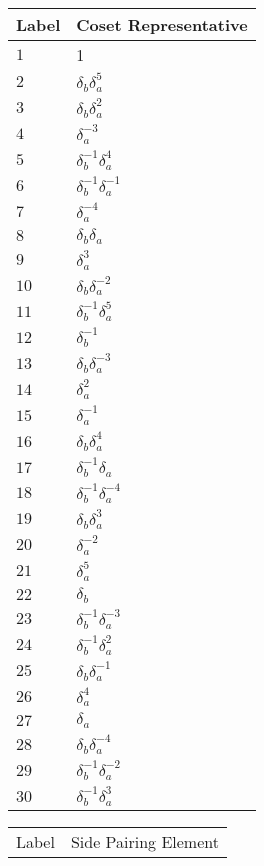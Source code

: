 \documentclass{article}
\begin{document}

\begin{center}
\begin{tabular}{ll}
\toprule
Label & Coset Representative\\
\midrule
$1$ & 1 \\
$2$ & $\delta_b^{}\delta_a^{5}$ \\
$3$ & $\delta_b^{}\delta_a^{2}$ \\
$4$ & $\delta_a^{-3}$ \\
$5$ & $\delta_b^{-1}\delta_a^{4}$ \\
$6$ & $\delta_b^{-1}\delta_a^{-1}$ \\
$7$ & $\delta_a^{-4}$ \\
$8$ & $\delta_b^{}\delta_a^{}$ \\
$9$ & $\delta_a^{3}$ \\
$10$ & $\delta_b^{}\delta_a^{-2}$ \\
$11$ & $\delta_b^{-1}\delta_a^{5}$ \\
$12$ & $\delta_b^{-1}$ \\
$13$ & $\delta_b^{}\delta_a^{-3}$ \\
$14$ & $\delta_a^{2}$ \\
$15$ & $\delta_a^{-1}$ \\
$16$ & $\delta_b^{}\delta_a^{4}$ \\
$17$ & $\delta_b^{-1}\delta_a^{}$ \\
$18$ & $\delta_b^{-1}\delta_a^{-4}$ \\
$19$ & $\delta_b^{}\delta_a^{3}$ \\
$20$ & $\delta_a^{-2}$ \\
$21$ & $\delta_a^{5}$ \\
$22$ & $\delta_b^{}$ \\
$23$ & $\delta_b^{-1}\delta_a^{-3}$ \\
$24$ & $\delta_b^{-1}\delta_a^{2}$ \\
$25$ & $\delta_b^{}\delta_a^{-1}$ \\
$26$ & $\delta_a^{4}$ \\
$27$ & $\delta_a^{}$ \\
$28$ & $\delta_b^{}\delta_a^{-4}$ \\
$29$ & $\delta_b^{-1}\delta_a^{-2}$ \\
$30$ & $\delta_b^{-1}\delta_a^{3}$ \\
\bottomrule
\end{tabular}
\hfill
\begin{tabular}{ll}
\toprule
Label & Side Pairing Element\\

\end{tabular}
\end{center}
\end{document}
